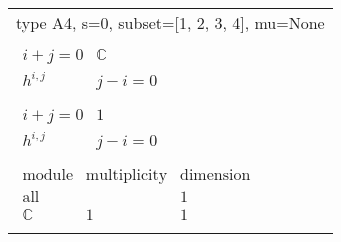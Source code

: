\documentclass[crop,border=2mm]{standalone}
\begin{document}
\begin{tabular}{l}
{\huge type A4, s=0, subset=[1, 2, 3, 4], mu=None}\\ \\


$\displaystyle
\begin{array}{r|l}
	{\scriptstyle i+j=0}&\mathbb{C}\\
	\hline h^{i,j}&{\scriptstyle j-i=0}
\end{array}
$ \\ \\


$\displaystyle
\begin{array}{r|l}
	{\scriptstyle i+j=0}&1\\
	\hline h^{i,j}&{\scriptstyle j-i=0}
\end{array}
$ \\ \\


$\displaystyle
\begin{array}{rll}
	\text{module}&\text{multiplicity}&\text{dimension} \\ \hline \text{all}&&1 \\
	\mathbb{C}&1&1
\end{array}
$ \\ \\

\end{tabular}
\end{document}
